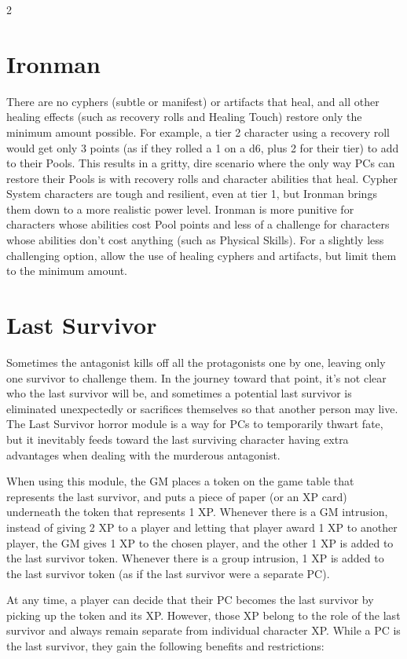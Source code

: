 \begin{multicols}{2}
\section{Ironman}
There are no cyphers (subtle or manifest) or artifacts that heal, and all other healing effects (such as recovery rolls and Healing Touch) restore only the minimum amount possible. For example, a tier 2 character using a recovery roll would get only 3 points (as if they rolled a 1 on a d6, plus 2 for their tier) to add to their Pools. This results in a gritty, dire scenario where the only way PCs can restore their Pools is with recovery rolls and character abilities that heal.
Cypher System characters are tough and resilient, even at tier 1, but Ironman brings them down to a more realistic power level. Ironman is more punitive for characters whose abilities cost Pool points and less of a challenge for characters whose abilities don’t cost anything (such as Physical Skills). For a slightly less challenging option, allow the use of healing cyphers and artifacts, but limit them to the minimum amount.

\section{Last Survivor}

Sometimes the antagonist kills off all the protagonists one by one, leaving only one survivor to challenge them. In the journey toward that point, it’s not clear who the last survivor will be, and sometimes a potential last survivor is eliminated unexpectedly or sacrifices themselves so that another person may live. The Last Survivor horror module is a way for PCs to temporarily thwart fate, but it inevitably feeds toward the last surviving character having extra advantages when dealing with the murderous antagonist.

When using this module, the GM places a token on the game table that represents the last survivor, and puts a piece of paper (or an XP card) underneath the token that represents 1 XP. Whenever there is a GM intrusion, instead of giving 2 XP to a player and letting that player award 1 XP to another player, the GM gives 1 XP to the chosen player, and the other 1 XP is added to the last survivor token. Whenever there is a group intrusion, 1 XP is added to the last survivor token (as if the last survivor were a separate PC).

At any time, a player can decide that their PC becomes the last survivor by picking up the token and its XP.
However, those XP belong to the role of the last survivor and always remain separate from individual character XP. While a PC is the last survivor, they gain the following benefits and restrictions:


\end{multicols}

